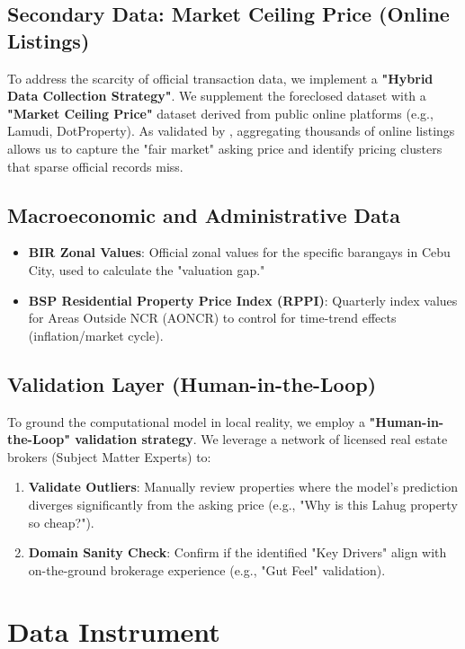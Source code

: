 \subsection{Secondary Data: Market Ceiling Price (Online Listings)}

To address the scarcity of official transaction data, we implement a \textbf{"Hybrid Data Collection Strategy"}. We supplement the foreclosed dataset with a \textbf{"Market Ceiling Price"} dataset derived from public online platforms (e.g., Lamudi, DotProperty). As validated by \textcite{sousa2024}, aggregating thousands of online listings allows us to capture the "fair market" asking price and identify pricing clusters that sparse official records miss.

\subsection{Macroeconomic and Administrative Data}

\begin{itemize}
    \item \textbf{BIR Zonal Values}: Official zonal values for the specific barangays in Cebu City, used to calculate the "valuation gap."
    \item \textbf{BSP Residential Property Price Index (RPPI)}: Quarterly index values for Areas Outside NCR (AONCR) to control for time-trend effects (inflation/market cycle).
\end{itemize}

\subsection{Validation Layer (Human-in-the-Loop)}

To ground the computational model in local reality, we employ a \textbf{"Human-in-the-Loop" validation strategy}. We leverage a network of licensed real estate brokers (Subject Matter Experts) to:
\begin{enumerate}
    \item \textbf{Validate Outliers}: Manually review properties where the model's prediction diverges significantly from the asking price (e.g., "Why is this Lahug property so cheap?").
    \item \textbf{Domain Sanity Check}: Confirm if the identified "Key Drivers" align with on-the-ground brokerage experience (e.g., "Gut Feel" validation).
\end{enumerate}

\section{Data Instrument}

